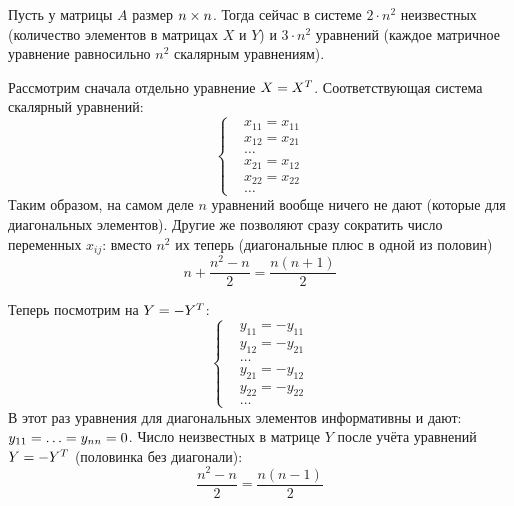 \documentclass[a4paper,12pt]{article}
\begin{document}
\begin{solution}
    Пусть у матрицы $A$ размер $n \hm\times n$.
    Тогда сейчас в системе $2 \cdot n^2$ неизвестных (количество элементов в матрицах $X$ и $Y$) и $3 \cdot n^2$ уравнений (каждое матричное уравнение равносильно $n^2$ скалярным уравнениям).
    
    Рассмотрим сначала отдельно уравнение $X \hm= X^T$.
    Соответствующая система скалярный уравнений:
    \[
      \left\{
        \begin{aligned}
          &x_{11} = x_{11}\\
          &x_{12} = x_{21}\\
          &\ldots\\
          &x_{21} = x_{12}\\
          &x_{22} = x_{22}\\
          &\ldots
        \end{aligned}
      \right.
    \]
    Таким образом, на самом деле $n$ уравнений вообще ничего не дают (которые для диагональных элементов).
    Другие же позволяют сразу сократить число переменных $x_{ij}$: вместо $n^2$ их теперь (диагональные плюс в одной из половин)
    \[
      n + \frac{n^2 - n}{2} = \frac{n (n + 1)}{2}
    \]
    
    Теперь посмотрим на $Y \hm= -Y^T$:
    \[
      \left\{
        \begin{aligned}
          &y_{11} = -y_{11}\\
          &y_{12} = -y_{21}\\
          &\ldots\\
          &y_{21} = -y_{12}\\
          &y_{22} = -y_{22}\\
          &\ldots
        \end{aligned}
      \right.
    \]
    В этот раз уравнения для диагональных элементов информативны и дают: $y_{11} \hm= \ldots \hm= y_{nn} \hm= 0$.
    Число неизвестных в матрице $Y$ после учёта уравнений $Y \hm= -Y^T$ (половинка без диагонали):
    \[
      \frac{n^2 - n}{2} = \frac{n (n - 1)}{2}
    \]
    

\end{solution}
\end{document}
